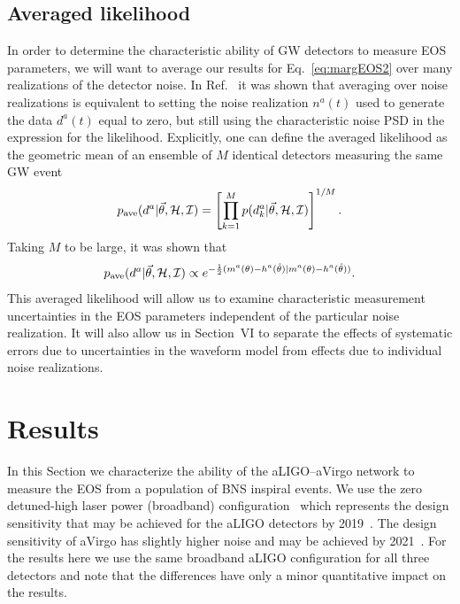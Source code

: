 \documentclass[twocolumn,prd,amssymb,aps,nofootinbib,showpacs,epsf]{revtex4}
\begin{document}
\subsection{Averaged likelihood}

In order to determine the characteristic ability of GW detectors to measure EOS parameters, we will want to average our results for Eq.~\eqref{eq:margEOS2} over many realizations of the detector noise. In Ref.~\cite{NissankeHolzHughes2010} it was shown that averaging over noise realizations is equivalent to setting the noise realization $n^a(t)$ used to generate the data $d^a(t)$ equal to zero, but still using the characteristic noise PSD in the expression for the likelihood. Explicitly, one can define the averaged likelihood as the geometric mean of an ensemble of $M$ identical detectors measuring the same GW event
\begin{equation}
p_{\rm ave}(d^a | \vec\theta, \mathcal{H}, \mathcal{I}) = \left[\prod_{k=1}^M p(d_k^a | \vec\theta, \mathcal{H}, \mathcal{I})\right]^{1/M}.
\end{equation}
Taking $M$ to be large, it was shown that
\begin{equation}
\label{eq:averagedlike}
p_{\rm ave}(d^a | \vec\theta, \mathcal{H}, \mathcal{I}) \propto e^{-\frac{1}{2}(m^a(\theta) - h^a(\hat\theta) | m^a(\theta) - h^a(\hat\theta))}.
\end{equation}
This averaged likelihood will allow us to examine characteristic measurement uncertainties in the EOS parameters independent of the particular noise realization. It will also allow us in Section~VI to separate the effects of systematic errors due to uncertainties in the waveform model from effects due to individual noise realizations.


\section{Results}
\label{sec:results}

In this Section we characterize the ability of the aLIGO--aVirgo network to measure the EOS from a population of BNS inspiral events. We use the zero detuned-high laser power (broadband) configuration~\cite{LIGOnoise} which represents the design sensitivity that may be achieved for the aLIGO detectors by 2019~\cite{AasiAbadieAbbott2013}. The design sensitivity of aVirgo has slightly higher noise and may be achieved by 2021~\cite{AasiAbadieAbbott2013}. For the results here we use the same broadband aLIGO configuration for all three detectors and note that the differences have only a minor quantitative impact on the results.
\end{document}
